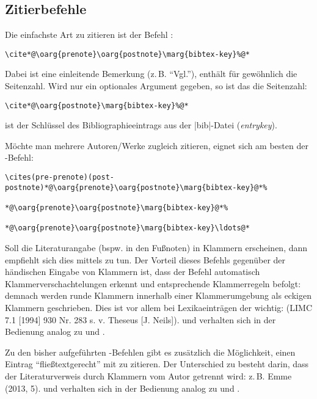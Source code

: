 \documentclass[a4paper,10pt,ngerman]{ltxdoc}
\begin{document}


\subsection{Zitierbefehle}\label{cite_commands}
\DescribeMacro{\cite}  Die einfachste Art zu zitieren ist der Befehl :
\begin{lstlisting}
\cite*@\oarg{prenote}\oarg{postnote}\marg{bibtex-key}%@*
\end{lstlisting}

Dabei ist  eine einleitende Bemerkung (z.\,B. \enquote{Vgl.}),  enthält für gewöhnlich die Seitenzahl. 
Wird nur ein optionales Argument gegeben, so ist das die Seitenzahl:
\begin{lstlisting}
\cite*@\oarg{postnote}\marg{bibtex-key}%@*
\end{lstlisting}

 ist der Schlüssel des Bibliographieeintrags aus der |bib|-Datei (\emph{entrykey}).

\DescribeMacro{\cites}  Möchte man mehrere Autoren/Werke zugleich zitieren, eignet sich am besten der -Befehl:
\begin{lstlisting}
\cites(pre-prenote)(post-postnote)*@\oarg{prenote}\oarg{postnote}\marg{bibtex-key}@*%
 																	*@\oarg{prenote}\oarg{postnote}\marg{bibtex-key}@*%
 																	*@\oarg{prenote}\oarg{postnote}\marg{bibtex-key}\ldots@*
\end{lstlisting}
 
\DescribeMacro{\parencite}  \DescribeMacro{\parencites}  Soll die Literaturangabe (bspw. in den Fußnoten) in Klammern erscheinen, dann empfiehlt sich dies mittels  zu tun.
Der Vorteil dieses Befehls gegenüber der händischen Eingabe von Klammern ist, dass der Befehl automatisch Klammerverschachtelungen erkennt und entsprechende Klammerregeln befolgt: demnach werden runde Klammern innerhalb einer Klammerumgebung als eckigen Klammern geschrieben.
Dies ist vor allem bei Lexikaeinträgen der wichtig: (LIMC 7.1 [1994] 930 Nr. 283 s. v. Theseus [J. Neils]).
 und  verhalten sich in der Bedienung analog zu  und .
 
\DescribeMacro{\textcite}  \DescribeMacro{\textcites}  Zu den bisher aufgeführten -Befehlen gibt es zusätzlich die Möglichkeit, einen Eintrag \enquote{fließtextgerecht} mit  zu zitieren. 
Der Unterschied zu  besteht darin, dass der Literaturverweis durch Klammern vom Autor getrennt wird: z.\,B. Emme (2013, 5).
 und  verhalten sich in der Bedienung analog zu  und .
\end{document}
